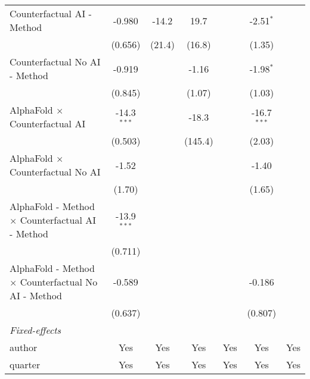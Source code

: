 \begin{tabular}{lcccccc}
   Counterfactual AI - Method                                 & -0.980        & -14.2   & 19.7         &                & -2.51$^{*}$   &   \\   
                                                              & (0.656)       & (21.4)  & (16.8)       &                & (1.35)        &   \\   
   Counterfactual No AI - Method                              & -0.919        &         & -1.16        &                & -1.98$^{*}$   &   \\   
                                                              & (0.845)       &         & (1.07)       &                & (1.03)        &   \\   
   AlphaFold $\times$ Counterfactual AI                       & -14.3$^{***}$ &         & -18.3        &                & -16.7$^{***}$ &   \\   
                                                              & (0.503)       &         & (145.4)      &                & (2.03)        &   \\   
   AlphaFold $\times$ Counterfactual No AI                    & -1.52         &         &              &                & -1.40         &   \\   
                                                              & (1.70)        &         &              &                & (1.65)        &   \\   
   AlphaFold - Method $\times$ Counterfactual AI - Method     & -13.9$^{***}$ &         &              &                &               &   \\   
                                                              & (0.711)       &         &              &                &               &   \\   
   AlphaFold - Method $\times$ Counterfactual No AI - Method  & -0.589        &         &              &                & -0.186        &   \\   
                                                              & (0.637)       &         &              &                & (0.807)       &   \\   
   \midrule
   \emph{Fixed-effects}\\
   author                                                     & Yes           & Yes     & Yes          & Yes            & Yes           & Yes\\  
   quarter                                                    & Yes           & Yes     & Yes          & Yes            & Yes           & Yes\\  

\end{tabular}
